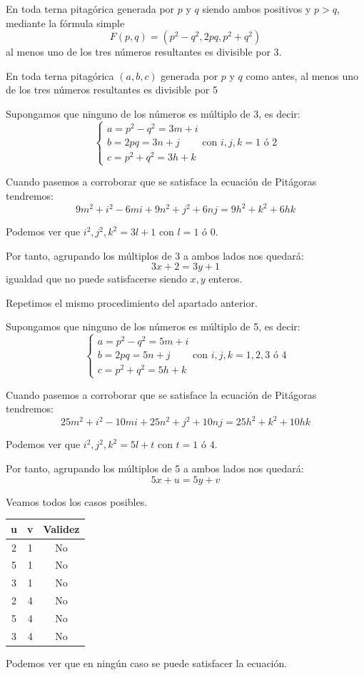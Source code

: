 \begin{problem}[12]
\ppart En toda terna pitagórica generada por $p$ y $q$ siendo ambos positivos y $p>q$, mediante la fórmula simple
\[F(p,q)=(p^2-q^2,2pq,p^2+q^2)\]
al menos uno de los tres números resultantes es divisible por 3.

\ppart En toda terna pitagórica $(a,b,c)$ generada por $p$ y $q$ como antes, al menos uno de los tres números resultantes es divisible por 5
\solution


\spart

Supongamos que ninguno de los números es múltiplo de 3, es decir:
\[\left\{ \begin{array}{l} a=p^2-q^2=3m+i \\ b=2pq=3n+j \\ c=p^2+q^2=3h+k \end{array} \right. \text{con } i,j,k = 1 \text{ ó } 2\]

Cuando pasemos a corroborar que se satisface la ecuación de Pitágoras tendremos:
\[9m^2+i^2-6mi+9n^2+j^2+6nj=9h^2+k^2+6hk\]

Podemos ver que $i^2,j^2,k^2=3l+1$ con $l=1 \text{ ó } 0$.

Por tanto, agrupando los múltiplos de 3 a ambos lados nos quedará:
\[3x+2=3y+1\]
igualdad que no puede satisfacerse siendo $x,y$ enteros.

\spart

Repetimos el mismo procedimiento del apartado anterior.

Supongamos que ninguno de los números es múltiplo de 5, es decir:
\[\left\{ \begin{array}{l} a=p^2-q^2=5m+i \\ b=2pq=5n+j \\ c=p^2+q^2=5h+k \end{array} \right. \text{con } i,j,k = 1,2,3 \text{ ó } 4\]

Cuando pasemos a corroborar que se satisface la ecuación de Pitágoras tendremos:
\[25m^2+i^2-10mi+25n^2+j^2+10nj=25h^2+k^2+10hk\]

Podemos ver que $i^2,j^2,k^2=5l+t$ con $t=1 \text{ ó } 4$.

Por tanto, agrupando los múltiplos de 5 a ambos lados nos quedará:
\[5x+u=5y+v\]

Veamos todos los casos posibles.
\begin{center}
\begin{tabular}{|c|c|c|}
\hline
u & v & Validez\\
\hline
\hline
2 & 1 & No \\
 \hline
5 & 1 & No \\
 \hline
3 & 1 & No \\
\hline
2 & 4 & No \\
 \hline
5 & 4 & No \\
 \hline
3 & 4 & No \\
\hline
\end{tabular}
\end{center}

Podemos ver que en ningún caso se puede satisfacer la ecuación.

\end{problem}

